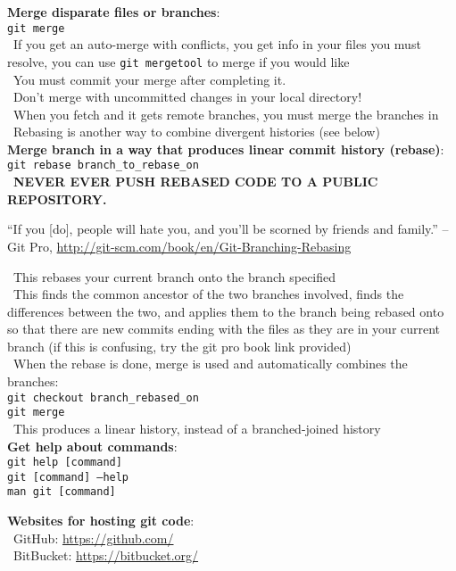 \documentclass[12pt]{article}
\begin{document}
{{\bf Merge disparate files or branches}:\\
\texttt{git merge}\\    
\textbullet\, If you get an auto-merge with conflicts, you get info in your files you must resolve, you can use \texttt{git mergetool} to merge if you would like\\
\textbullet\, You must commit your merge after completing it.\\
\textbullet\, Don't merge with uncommitted changes in your local directory!\\
\textbullet\, When you fetch and it gets remote branches, you must merge the branches in\\
\textbullet\, Rebasing is another way to combine divergent histories (see below)\\

{\bf Merge branch in a way that produces linear commit history (rebase)}:\\
\texttt{git rebase branch{\_}to{\_}rebase{\_}on}\\
\textbullet\, {\bf NEVER EVER PUSH REBASED CODE TO A PUBLIC REPOSITORY.}
\begin{quoting}[vskip=0pt]
``If you [do], people will hate you, and you’ll be scorned by friends and family.'' --Git Pro, \url{http://git-scm.com/book/en/Git-Branching-Rebasing}
\end{quoting}
\textbullet\, This rebases your current branch onto the branch specified\\
\textbullet\, This finds the common ancestor of the two branches involved, finds the differences between the two, and applies them to the branch being rebased onto so that there are new commits ending with the files as they are in your current branch (if this is confusing, try the git pro book link provided)\\
\textbullet\, When the rebase is done, merge is used and automatically combines the branches:\\
    \texttt{git checkout branch{\_}rebased{\_}on}\\
    \texttt{git merge}\\
\textbullet\, This produces a linear history, instead of a branched-joined history\\
    
{\bf Get help about commands}:\\
\texttt{git help [command]}\\
\texttt{git [command] --help}\\
\texttt{man git [command]}\\
\vspace{5mm}

{\bf Websites for hosting git code}:\\
\textbullet\, GitHub: \url{https://github.com/}\\
\textbullet\, BitBucket: \url{https://bitbucket.org/}\\
}
\end{document}
